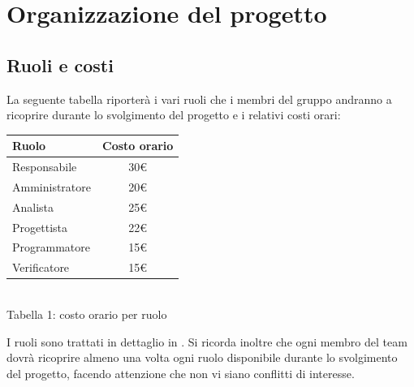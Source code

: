\section{Organizzazione del progetto}
\subsection{Ruoli e costi}
La seguente tabella riporterà i vari ruoli che i membri del gruppo \gruppo andranno a ricoprire durante lo svolgimento del progetto e i relativi costi orari:
\begin{center}
\centering
\begin{tabular}{| l | c |}
\hline
Ruolo & Costo orario \\
\hline
Responsabile & 30\euro \\
Amministratore & 20\euro \\
Analista & 25\euro \\
Progettista & 22\euro \\
Programmatore & 15\euro \\
Verificatore & 15\euro \\
\hline
\end{tabular}
\\
Tabella 1: costo orario per ruolo
\end{center}
I ruoli sono trattati in dettaglio in \VerbaleB.
Si ricorda inoltre che ogni membro del team dovrà ricoprire almeno una volta ogni ruolo disponibile durante lo svolgimento del progetto, facendo attenzione che non vi siano conflitti di interesse.
